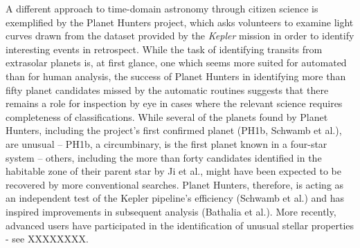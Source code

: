 \documentclass{ar2e}
\begin{document}

A different approach to time-domain astronomy through citizen science is
exemplified by the Planet Hunters project, which asks volunteers to examine
light curves drawn from the dataset provided by the \emph{Kepler} mission in
order to identify interesting events in retrospect. While the task of
identifying transits from extrasolar planets is, at first glance, one which
seems more suited for automated than for human analysis, the success of Planet
Hunters in identifying more than fifty planet candidates missed by the
automatic routines suggests that there remains a role for inspection by eye in
cases where the relevant science requires completeness of classifications.
While several of the planets found by Planet Hunters, including the project's
first confirmed planet (PH1b, Schwamb et al.), are unusual 
-- PH1b, a
circumbinary, is the first planet known in a four-star system --  others,
including the more than forty candidates identified in the habitable zone of
their parent star by Ji et al., might have been expected to be recovered by
more conventional searches. Planet Hunters, therefore, is acting as an
independent test of the Kepler pipeline's efficiency (Schwamb et al.) and has
inspired improvements in subsequent analysis (Bathalia et al.). More recently,
advanced users have participated in the identification of unusual stellar
properties - see XXXXXXXX. 




\end{document}
